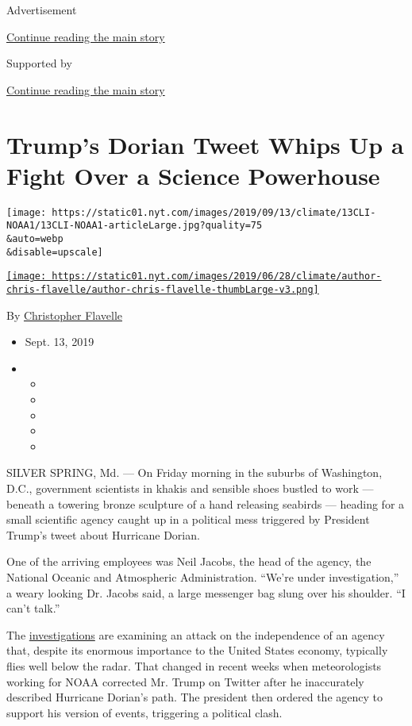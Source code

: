 Advertisement

\protect\hyperlink{after-top}{Continue reading the main story}

Supported by

\protect\hyperlink{after-sponsor}{Continue reading the main story}

\hypertarget{trumps-dorian-tweet-whips-up-a-fight-over-a-science-powerhouse}{%
\section{Trump's Dorian Tweet Whips Up a Fight Over a Science
Powerhouse}\label{trumps-dorian-tweet-whips-up-a-fight-over-a-science-powerhouse}}

\texttt{[image: https://static01.nyt.com/images/2019/09/13/climate/13CLI-NOAA1/13CLI-NOAA1-articleLarge.jpg?quality=75\\\&auto=webp\\\&disable=upscale]}

\href{https://www.nytimes.com/by/christopher-flavelle}{\texttt{[image: https://static01.nyt.com/images/2019/06/28/climate/author-chris-flavelle/author-chris-flavelle-thumbLarge-v3.png]}}

By \href{https://www.nytimes.com/by/christopher-flavelle}{Christopher
Flavelle}

\begin{itemize}
\item
  Sept. 13, 2019
\item
  \begin{itemize}
  \item
  \item
  \item
  \item
  \item
  \end{itemize}
\end{itemize}

SILVER SPRING, Md. --- On Friday morning in the suburbs of Washington,
D.C., government scientists in khakis and sensible shoes bustled to work
--- beneath a towering bronze sculpture of a hand releasing seabirds ---
heading for a small scientific agency caught up in a political mess
triggered by President Trump's tweet about Hurricane Dorian.

One of the arriving employees was Neil Jacobs, the head of the agency,
the National Oceanic and Atmospheric Administration. ``We're under
investigation,'' a weary looking Dr. Jacobs said, a large messenger bag
slung over his shoulder. ``I can't talk.''

The
\href{https://www.nytimes.com/2019/09/11/climate/noaa-wilbur-ross-dorian.html?rref=collection\%2Fbyline\%2Fchristopher-flavelle\&action=click\&contentCollection=undefined\&region=stream\&module=stream_unit\&version=latest\&contentPlacement=3\&pgtype=collection}{investigations}
are examining an attack on the independence of an agency that, despite
its enormous importance to the United States economy, typically flies
well below the radar. That changed in recent weeks when meteorologists
working for NOAA corrected Mr. Trump on Twitter after he inaccurately
described Hurricane Dorian's path. The president then ordered the agency
to support his version of events, triggering a political clash.

